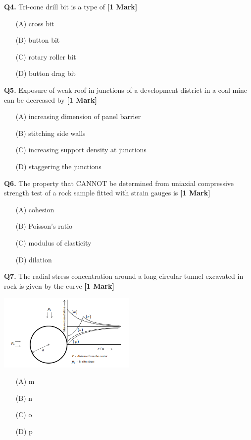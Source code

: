 \documentclass[11pt]{article}
\newcommand{\questiona}[2]{
    \noindent\textbf{Q#2.} #1 \hfill \textbf{[1 Mark]}
}
\begin{document}
\questiona{Tri-cone drill bit is a type of}{4}
\begin{enumerate}
    \item[(A)] cross bit
    \item[(B)] button bit
    \item[(C)] rotary roller bit
    \item[(D)] button drag bit
\end{enumerate}
\vspace{0.5cm}

\questiona{Exposure of weak roof in junctions of a development district in a coal mine can be decreased by}{5}
\begin{enumerate}
    \item[(A)] increasing dimension of panel barrier
    \item[(B)] stitching side walls
    \item[(C)] increasing support density at junctions
    \item[(D)] staggering the junctions
\end{enumerate}
\vspace{0.5cm}

\questiona{The property that CANNOT be determined from uniaxial compressive strength test of a rock sample fitted with strain gauges is}{6}
\begin{enumerate}
    \item[(A)] cohesion
    \item[(B)] Poisson’s ratio
    \item[(C)] modulus of elasticity
    \item[(D)] dilation
\end{enumerate}
\vspace{0.5cm}

\questiona{The radial stress concentration around a long circular tunnel excavated in rock is given by the curve}{7}
\begin{center}
\includegraphics[width=0.5\textwidth]{figures/7.png}
\end{center}
\begin{enumerate}
    \item[(A)] m
    \item[(B)] n
    \item[(C)] o
    \item[(D)] p
\end{enumerate}
\vspace{0.5cm}
\end{document}
